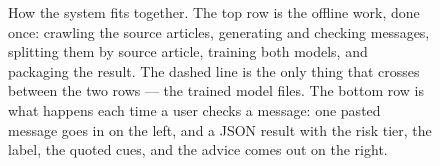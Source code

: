 \begin{figure}[H]
\caption{How the system fits together. The top row is the offline work, done once: crawling the source articles, generating and checking messages, splitting them by source article, training both models, and packaging the result. The dashed line is the only thing that crosses between the two rows --- the trained model files. The bottom row is what happens each time a user checks a message: one pasted message goes in on the left, and a JSON result with the risk tier, the label, the quoted cues, and the advice comes out on the right.}
\label{fig:system-overview}
\end{figure}
